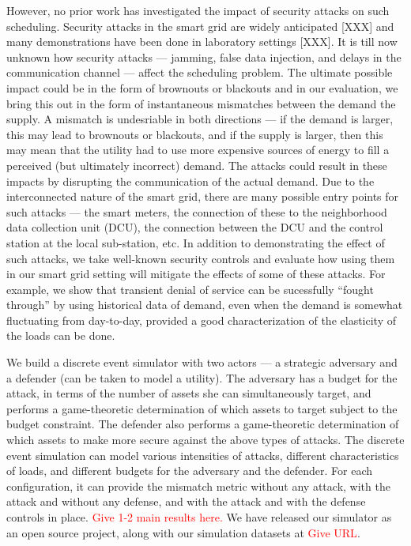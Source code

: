 \documentclass[conference]{IEEEtran}
\begin{document}
However, no prior work has investigated the impact of security attacks on such scheduling. Security attacks in the smart grid are widely anticipated [XXX] and many demonstrations have been done in laboratory settings [XXX]. It is till now unknown how security attacks --- jamming, false data injection, and delays in the communication channel --- affect the scheduling problem. The ultimate possible impact could be in the form of brownouts or blackouts and in our evaluation, we bring this out in the form of instantaneous mismatches between the demand the supply. A mismatch is undesriable in both directions --- if the demand is larger, this may lead to brownouts or blackouts, and if the supply is larger, then this may mean that the utility had to use more expensive sources of energy to fill a perceived (but ultimately incorrect) demand. The attacks could result in these impacts by disrupting the communication of the actual demand. Due to the interconnected nature of the smart grid, there are many possible entry points for such attacks --- the smart meters, the connection of these to the neighborhood data collection unit (DCU), the connection between the DCU and the control station at the local sub-station, etc. In addition to demonstrating the effect of such attacks, we take well-known security controls and evaluate how using them in our smart grid setting will mitigate the effects of some of these attacks. For example, we show that transient denial of service can be sucessfully ``fought through'' by using historical data of demand, even when the demand is somewhat fluctuating from day-to-day, provided a good characterization of the elasticity of the loads can be done. 

We build a discrete event simulator with two actors --- a strategic adversary and a defender (can be taken to model a utility). The adversary has a budget for the attack, in terms of the number of assets she can simultaneously target, and performs a game-theoretic determination of which assets to target subject to the budget constraint. The defender also performs a game-theoretic determination of which assets to make more secure against the above types of attacks. The discrete event simulation can model various intensities of attacks, different characteristics of loads, and different budgets for the adversary and the defender. For each configuration, it can provide the mismatch metric without any attack, with the attack and without any defense, and with the attack and with the defense controls in place. 
\textcolor{red} {Give 1-2 main results here.}
We have released our simulator as an open source project, along with our simulation datasets at \textcolor{red}{Give URL}. 
\end{document}
